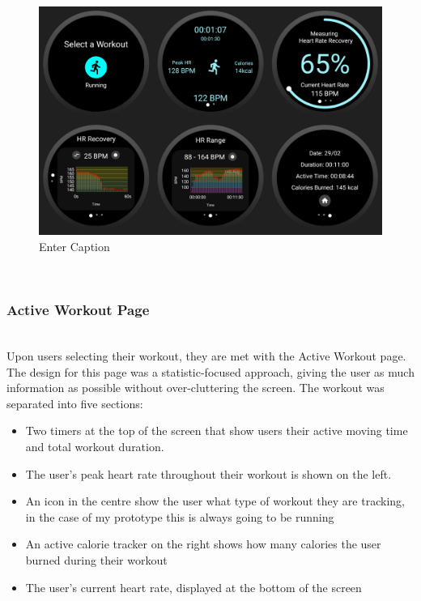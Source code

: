 \documentclass{l4proj}
\begin{document}
\begin{figure}[h!]
    \centering
    \includegraphics[width=1\linewidth]{dissertation//dissImages/ActiveWorkoutCombined.png}
    \caption{Enter Caption}
    \label{fig:enter-label}
\end{figure}

\noindent\mbox{}\\
\subsubsection{Active Workout Page}
\label{sec:activeworkoutsubsection}
\noindent\mbox{}\\


Upon users selecting their workout, they are met with the Active Workout page. The design for this page was a statistic-focused approach, giving the user as much information as possible without over-cluttering the screen. The workout was separated into five sections:

\begin{itemize}
    \item Two timers at the top of the screen that show users their active moving time and total workout duration.
    \item The user’s peak heart rate throughout their workout is shown on the left.
    \item An icon in the centre show the user what type of workout they are tracking, in the case of my prototype this is always going to be running
    \item An active calorie tracker on the right shows how many calories the user burned during their workout
    \item The user’s current heart rate, displayed at the bottom of the screen
\end{itemize}
\end{document}
